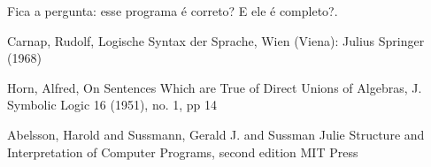   Fica a pergunta: esse programa é correto? E ele é completo?.


  \begin{thebibliography}{1}

     Carnap, Rudolf,
     Logische Syntax der Sprache,
     Wien (Viena): Julius Springer (1968)

     Horn, Alfred,
     On Sentences Which are True of Direct Unions of Algebras,
     J. Symbolic Logic 16 (1951),
     no. 1,
     pp 14

     Abelsson, Harold and Sussmann, Gerald J. and Sussman Julie
     Structure and Interpretation of Computer Programs, second edition
     MIT Press

  \end{thebibliography}


